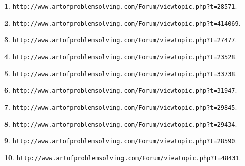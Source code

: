 \documentclass{article}
\theoremstyle{definition}
\newtheorem{s}{}
\begin{document}
	
	
	
	\begin{s}
		\texttt{http://www.artofproblemsolving.com/Forum/viewtopic.php?t=28571}.
	\end{s}
	
	
	
	
	\begin{s}
		\texttt{http://www.artofproblemsolving.com/Forum/viewtopic.php?t=414069}.
	\end{s}
	
	
	
	
	\begin{s}
		\texttt{http://www.artofproblemsolving.com/Forum/viewtopic.php?t=27477}.
	\end{s}
	
	
	
	
	\begin{s}
		\texttt{http://www.artofproblemsolving.com/Forum/viewtopic.php?t=23528}.
	\end{s}
	
	
	
	
	\begin{s}
		\texttt{http://www.artofproblemsolving.com/Forum/viewtopic.php?t=33738}.
	\end{s}
	
	
	
	
	\begin{s}
		\texttt{http://www.artofproblemsolving.com/Forum/viewtopic.php?t=31947}.
	\end{s}
	
	
	
	
	\begin{s}
		\texttt{http://www.artofproblemsolving.com/Forum/viewtopic.php?t=29845}.
	\end{s}
	
	
	
	
	\begin{s}
		\texttt{http://www.artofproblemsolving.com/Forum/viewtopic.php?t=29434}.
	\end{s}
	
	
	
	
	\begin{s}
		\texttt{http://www.artofproblemsolving.com/Forum/viewtopic.php?t=28590}.
	\end{s}
	
	
	
	
	\begin{s}
		\texttt{http://www.artofproblemsolving.com/Forum/viewtopic.php?t=48431}.
	\end{s}
	
\end{document}
